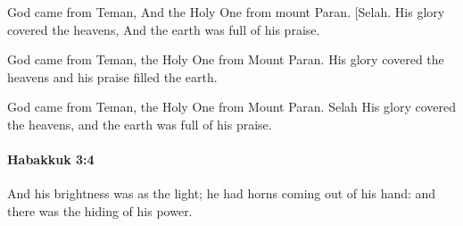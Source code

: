 			\begin{versebox}
					\item[BHS] 
					\item[LXX] 
					\item[ASV] God came from Teman, And the Holy One from mount Paran. [Selah. His glory covered the heavens, And the earth was full of his praise.
					\item[NIV] God came from Teman, the Holy One from Mount Paran. His glory covered the heavens and his praise filled the earth.
					\item[NRSV] God came from Teman, the Holy One from Mount Paran. Selah His glory covered the heavens, and the earth was full of his praise.
			\end{versebox}

		\paragraph{Habakkuk 3:4} %
			\label{HABAKKUK-3-4}

			And his brightness was as the light; he had horns coming out of his hand: and there was the hiding of his power.

